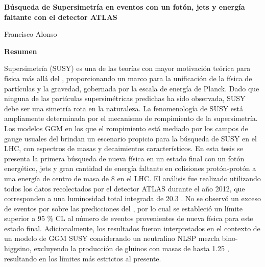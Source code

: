 \thispagestyle{plain}
\begin{center}
  \Large
  \textbf{Búsqueda de Supersimetría en eventos con un fotón,
      jets y energía faltante con el detector ATLAS}

  \vspace{0.4cm}
  \large

  \vspace{0.4cm}
  Francisco Alonso

  \vspace{2cm}
  \textbf{Resumen}
\end{center}

Supersimetría (SUSY) es una de las teorías con mayor motivación teórica para
física más allá del {\SM}, proporcionando un marco para la unificación de la
física de partículas y la gravedad, gobernada por la escala de energía de
Planck. Dado que ninguna de las partículas supersimétricas predichas ha sido
observada, SUSY debe ser una simetría rota en la naturaleza. La fenomenología de
SUSY está ampliamente determinada por el mecanismo de rompimiento de la
supersimetría. Los modelos GGM en los que el rompimiento está mediado por los
campos de gauge usuales del {\SM} brindan un escenario propicio para la búsqueda
de SUSY en el LHC, con espectros de masas y decaimientos característicos. En
esta tesis se presenta la primera búsqueda de nueva física en un estado final
con un fotón energético, jets y gran cantidad de energía faltante en colisiones
protón-protón a una energía de centro de masa de 8 {\tev} en el LHC. El análisis
fue realizado utilizando todos los datos recolectados por el detector ATLAS
durante el a\~no 2012, que corresponden a una luminosidad total integrada de
20.3 \ifb. No se observó un exceso de eventos por sobre las predicciones del
{\SM}, por lo cual se estableció un límite superior a 95 \% CL al número de
eventos provenientes de nueva física para este estado final. Adicionalmente, los
resultados fueron interpretados en el contexto de un modelo de GGM SUSY
considerando un neutralino NLSP mezcla bino-higgsino,
excluyendo la producción de gluinos con masas de hasta 1.25 \tev, resultando en
los límites más estrictos al presente.
